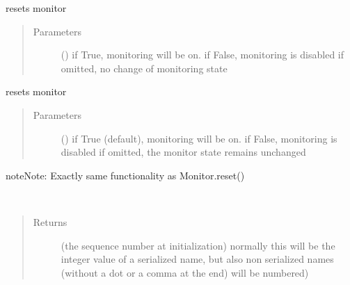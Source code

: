 \documentclass[letterpaper,10pt,english]{sphinxmanual}
\begin{document}
\begin{fulllineitems}
\begin{fulllineitems}
\label{\detokenize{Reference:salabim.Monitor.reset}}
resets monitor
\begin{quote}\begin{description}
\item[{Parameters}] \leavevmode
{} () \textendash{} if True, monitoring will be on. 
if False, monitoring is disabled
if omitted, no change of monitoring state

\end{description}\end{quote}

\end{fulllineitems}


\begin{fulllineitems}
\label{\detokenize{Reference:salabim.Monitor.reset_monitors}}
resets monitor
\begin{quote}\begin{description}
\item[{Parameters}] \leavevmode
{} () \textendash{} if True (default), monitoring will be on. 
if False, monitoring is disabled 
if omitted, the monitor state remains unchanged

\end{description}\end{quote}

\begin{sphinxadmonition}{note}{Note:}
Exactly same functionality as Monitor.reset()
\end{sphinxadmonition}

\end{fulllineitems}


\begin{fulllineitems}
\label{\detokenize{Reference:salabim.Monitor.sequence_number}}~\begin{quote}\begin{description}
\item[{Returns}] \leavevmode
{} \textendash{} (the sequence number at initialization) 
normally this will be the integer value of a serialized name,
but also non serialized names (without a dot or a comma at the end)
will be numbered)


\end{description}
\end{quote}
\end{fulllineitems}
\end{fulllineitems}
\end{document}
